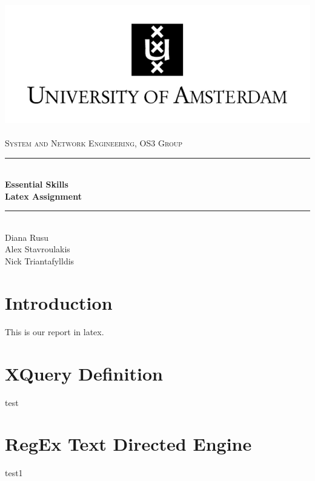 \documentclass[a4paper,11pt]{report}
\newcommand{\HRule}{\rule{\linewidth}{0.5mm}}
\begin{document}
\begin{titlepage}

\begin{center}

\includegraphics{images/UvA-logo-2a.png}~\\[1cm]

\textsc{\LARGE System and Network Engineering, OS3 Group}\\[1.5cm]

\HRule \\

{ \huge \bfseries Essential Skills\\Latex Assignment}

\HRule \\[1cm]

\large{Diana Rusu} \\
\large{Alex Stavroulakis}\\
\large{Nick Triantafylldis}\\


\end{center}
\end{titlepage}

\tableofcontents

\chapter* {Introduction}

This is our report in latex.


\chapter{XQuery Definition}

test

\chapter{RegEx Text Directed Engine}

test1
\end{document}
